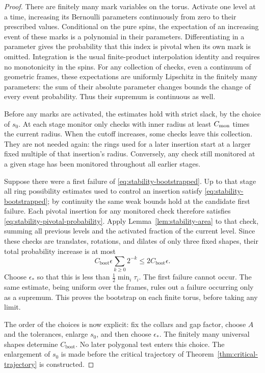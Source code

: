 \begin{proof}
There are finitely many mark variables on the torus.  Activate
one level at a time, increasing its Bernoulli parameters
continuously from zero to their prescribed values.  Conditional
on the pure spins, the expectation of an increasing event of
these marks is a polynomial in their parameters.  Differentiating
in a parameter gives the probability that this index is pivotal
when its own mark is omitted.  Integration is the usual
finite-product interpolation identity and requires no monotonicity
in the spins.  For any collection of checks, even a continuum
of geometric frames, these expectations are uniformly Lipschitz
in the finitely many parameters: the sum of their absolute
parameter changes bounds the change of every event probability.
Thus their supremum is continuous as well.

Before any marks are activated, the estimates hold with strict
slack, by the choice of $s_0$.  At each stage monitor only
checks with inner radius at least $C_{\rm mon}$ times the current radius.
When the cutoff increases, some checks leave this collection.
They are not needed again: the rings used for a later insertion
start at a larger fixed multiple of that insertion's radius.
Conversely, any check still monitored at a given stage has
been monitored throughout all earlier stages.

Suppose there were a first failure of
\eqref{eq:stability-bootstrapped}.  Up to that stage all ring
possibility estimates used to control an insertion satisfy
\eqref{eq:stability-bootstrapped}; by continuity the same weak
bounds hold at the candidate first failure.  Each pivotal
insertion for any monitored check therefore satisfies
\eqref{eq:stability-pivotal-probability}.  Apply
Lemma~\ref{lem:stability-area} to that check, summing all
previous levels and the activated fraction of the current
level.  Since these checks are translates, rotations, and
dilates of only three fixed shapes, their total probability
increase is at most
\[
 C_{\mathrm{boot}}\epsilon\sum_{k\geq0}2^{-k}
       \leq2C_{\mathrm{boot}}\epsilon.
\]
Choose $\epsilon_*$ so that this is less than
$\frac12\min_i\tau_i$.  The first failure cannot occur.
The same estimate, being uniform over the frames, rules out
a failure occurring only as a supremum.  This proves the
bootstrap on each finite torus, before taking any limit.

The order of the choices is now explicit: fix the collars
and gap factor, choose $A$ and the tolerances, enlarge $s_0$,
and then choose $\epsilon_*$.  The finitely many universal
shapes determine $C_{\mathrm{boot}}$.  No later polygonal
test enters this choice.  The enlargement of $s_0$ is made
before the critical trajectory of
Theorem~\ref{thm:critical-trajectory} is constructed.
\end{proof}

